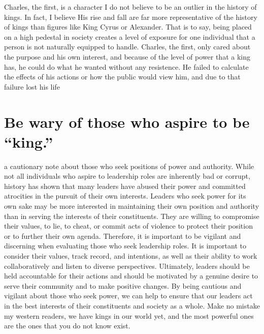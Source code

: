 \documentclass[
]{article}
\begin{document}
Charles, the first, is a character I do not believe to be an outlier in
the history of kings. In fact, I believe His rise and fall are far more
representative of the history of kings than figures like King Cyrus or
Alexander. That is to say, being placed on a high pedestal in society
creates a level of exposure for one individual that a person is not
naturally equipped to handle. Charles, the first, only cared about the
purpose and his own interest, and because of the level of power that a
king has, he could do what he wanted without any resistence. He failed
to calculate the effects of his actions or how the public would view
him, and due to that failure lost his life

\hypertarget{be-wary-of-those-who-aspire-to-be-king.}{%
\section{Be wary of those who aspire to be
``king.''}\label{be-wary-of-those-who-aspire-to-be-king.}}

a cautionary note about those who seek positions of power and authority.
While not all individuals who aspire to leadership roles are inherently
bad or corrupt, history has shown that many leaders have abused their
power and committed atrocities in the pursuit of their own interests.
Leaders who seek power for its own sake may be more interested in
maintaining their own position and authority than in serving the
interests of their constituents. They are willing to compromise their
values, to lie, to cheat, or commit acts of violence to protect their
position or to further their own agenda. Therefore, it is important to
be vigilant and discerning when evaluating those who seek leadership
roles. It is important to consider their values, track record, and
intentions, as well as their ability to work collaboratively and listen
to diverse perspectives. Ultimately, leaders should be held accountable
for their actions and should be motivated by a genuine desire to serve
their community and to make positive changes. By being cautious and
vigilant about those who seek power, we can help to ensure that our
leaders act in the best interests of their constituents and society as a
whole. Make no mistake my western readers, we have kings in our world
yet, and the most powerful ones are the ones that you do not know exist.
\end{document}

